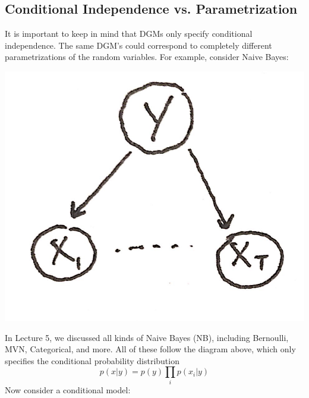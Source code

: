 \documentclass{article}
\begin{document}
\subsection{Conditional Independence vs. Parametrization}
It is important to keep in mind that DGMs only specify conditional independence. The same DGM's could correspond to completely different parametrizations of the random variables. For example, consider Naive Bayes:
\begin{center}
\includegraphics[scale=.1]{naive_bayes}
\end{center}
In Lecture 5, we discussed all kinds of Naive Bayes (NB), including Bernoulli, MVN, Categorical, and more. All of these follow the diagram above, which only specifies the conditional probability distribution
\[
p(x|y)=p(y)\prod\limits_i p(x_i|y)
\]
Now consider a conditional model:
\end{document}
